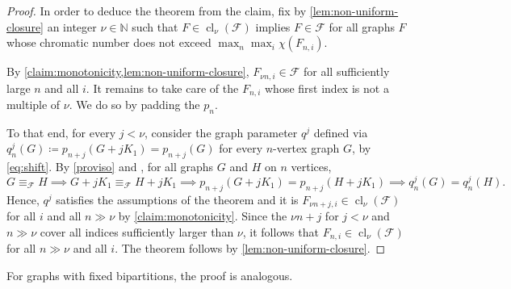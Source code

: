 \documentclass[10pt,a4paper]{article}
\theoremstyle{definition}
\theoremstyle{plain}
\theoremstyle{remark}
\DeclareMathOperator{\cl}{cl}
\begin{document}
\begin{proof}
		In order to deduce the theorem from the claim,
		fix by \cref{lem:non-uniform-closure} an integer $\nu \in \mathbb{N}$ such that $F \in \cl_\nu(\mathcal{F}) $ implies $F \in \mathcal{F}$
		for all graphs $F$ whose chromatic number does not exceed $\max_n \max_i \chi(F_{n,i})$.
		
		By \cref{claim:monotonicity,lem:non-uniform-closure},
		$F_{\nu n,i} \in \mathcal{F}$ for all sufficiently large $n$ and all $i$.
		It remains to take care of the $F_{n,i}$ whose first index is not a multiple of $\nu$.
		We do so by padding the $p_n$.
		
		To that end, for every $j < \nu$, 
		consider the graph parameter $q^j$
		defined via $q_n^j(G) \coloneqq p_{n+j}(G + jK_1) = p_{n+j}(G)$ for every $n$-vertex graph $G$,
		by \cref{eq:shift}.
		By \cref{proviso} and \cite[Theorem~7]{seppelt_logical_2024},
		for all graphs $G$ and $H$ on $n$ vertices,
		\[
			G \equiv_{\mathcal{F}} H
			\implies G+jK_1 \equiv_{\mathcal{F}} H+ jK_1
			\implies p_{n+j}(G+jK_1) = p_{n+j}(H+jK_1)
			\implies q_n^j(G) = q_n^j(H).
		\]
		Hence, $q^j$ satisfies the assumptions of the theorem
		and it is $F_{\nu n+j, i} \in \cl_{\nu}(\mathcal{F})$ for all $i$ and
		all $n \gg \nu$ by \cref{claim:monotonicity}.
		Since the $\nu n + j$ for $j < \nu$ and $n \gg \nu$ cover all indices sufficiently larger than $\nu$,
		it follows that $F_{n,i} \in \cl_\nu(\mathcal{F})$ for all $n \gg \nu$ and all $i$.
		The theorem follows by \cref{lem:non-uniform-closure}.
	\end{proof}
	
	For graphs with fixed bipartitions, the proof is analogous.
	
\end{document}
